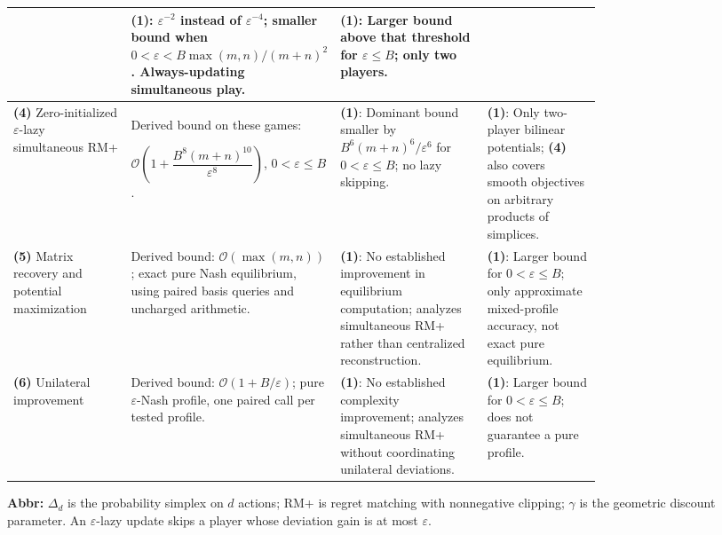 \begin{table}[tp]
\begin{threeparttable}
\begin{tabularx}{\linewidth}{@{}>{\raggedright\arraybackslash}p{0.20\linewidth}>{\raggedright\arraybackslash}p{0.32\linewidth}>{\raggedright\arraybackslash}p{0.25\linewidth}>{\raggedright\arraybackslash}X@{}}
& \textbf{(1)}: $\varepsilon^{-2}$ instead of $\varepsilon^{-4}$; smaller bound when $0<\varepsilon<B\max(m,n)/(m+n)^2$. Always-updating simultaneous play.
& \textbf{(1)}: Larger bound above that threshold for $\varepsilon\leq B$; only two players. \\
\midrule
\textbf{(4)} Zero-initialized $\varepsilon$-lazy simultaneous RM+ \citep[Thm.~3.12, App.~C.1]{rmpAnagnostides2025v2}
& Derived bound on these games:\par $\mathcal{O}\!\left(1+\dfrac{B^8(m+n)^{10}}{\varepsilon^8}\right)$, $0<\varepsilon\leq B$.
& \textbf{(1)}: Dominant bound smaller by $B^6(m+n)^6/\varepsilon^6$ for $0<\varepsilon\leq B$; no lazy skipping.
& \textbf{(1)}: Only two-player bilinear potentials; \textbf{(4)} also covers smooth objectives on arbitrary products of simplices. \\
\midrule
\textbf{(5)} Matrix recovery and potential maximization \citep[Lem.~2.1]{rmpMondererShapley1996}
& Derived bound: $\mathcal{O}(\max(m,n))$; exact pure Nash equilibrium, using paired basis queries and uncharged arithmetic.
& \textbf{(1)}: No established improvement in equilibrium computation; analyzes simultaneous RM+ rather than centralized reconstruction.
& \textbf{(1)}: Larger bound for $0<\varepsilon\leq B$; only approximate mixed-profile accuracy, not exact pure equilibrium. \\
\midrule
\textbf{(6)} Unilateral improvement \citep[Lem.~4.2]{rmpMondererShapley1996}
& Derived bound: $\mathcal{O}(1+B/\varepsilon)$; pure $\varepsilon$-Nash profile, one paired call per tested profile.
& \textbf{(1)}: No established complexity improvement; analyzes simultaneous RM+ without coordinating unilateral deviations.
& \textbf{(1)}: Larger bound for $0<\varepsilon\leq B$; does not guarantee a pure profile. \\
\bottomrule
\end{tabularx}
\begin{tablenotes}[flushleft]\footnotesize
\item[] \textbf{Abbr:} $\Delta_d$ is the probability simplex on $d$ actions; RM+ is regret matching with nonnegative clipping; $\gamma$ is the geometric discount parameter. An $\varepsilon$-lazy update skips a player whose deviation gain is at most $\varepsilon$.
\end{tablenotes}
\end{threeparttable}
\end{table}
\clearpage
